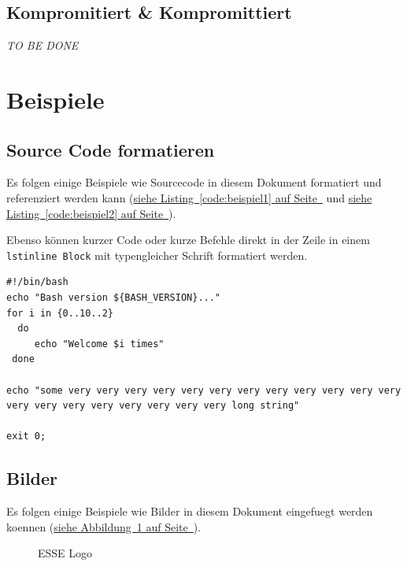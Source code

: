 \documentclass[12pt,a4paper,titlepage,oneside]{scrartcl}
\begin{document}
\subsection{Kompromitiert \& Kompromittiert}
\emph{TO BE DONE}

\section{Beispiele}

\subsection{Source Code formatieren}
Es folgen einige Beispiele wie Sourcecode in diesem Dokument formatiert und referenziert werden kann
(\hyperref[code:beispiel1]{siehe Listing~\ref*{code:beispiel1} auf Seite~\pageref*{code:beispiel1}} und \hyperref[code:beispiel2]{siehe Listing~\ref*{code:beispiel2} auf Seite~\pageref*{code:beispiel2}}).

Ebenso können kurzer Code oder kurze Befehle direkt in der Zeile in einem \lstinline{lstinline Block} mit typengleicher Schrift formatiert werden.



\begin{lstlisting}[caption=Example bash script,label=code:beispiel2,style=simple]
#!/bin/bash
echo "Bash version ${BASH_VERSION}..."
for i in {0..10..2}
  do
     echo "Welcome $i times"
 done

echo "some very very very very very very very very very very very very very very very very very very very very long string"

exit 0;
\end{lstlisting}

\subsection{Bilder}

Es folgen einige Beispiele wie Bilder in diesem Dokument eingefuegt werden koennen
(\hyperref[fig:logo1]{siehe Abbildung~\ref*{fig:logo1} auf Seite~\pageref*{fig:logo1}}).

\begin{figure}[h!]
  \centering
  \caption{ESSE Logo}
  \label{fig:logo1}
\end{figure}


%
%
\end{document}

